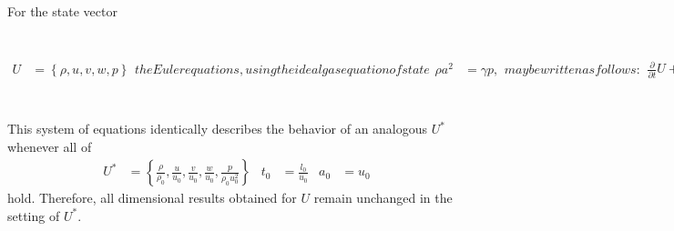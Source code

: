 \documentclass[letterpaper,11pt,nointlimits,reqno,draft]{amsbook}
\begin{document}
For the state vector
\begin{subequations}
\label{eq:eulerprim}
\begin{align}
  U &= \left\{ \rho, u, v, w, p \right\}
\end{align}
the Euler equations, using the ideal gas equation of state
\begin{align}
  \rho a^2 &= \gamma p,
\end{align}
may be written as follows:
\begin{align}
    \frac{\partial}{\partial{}t}U
+ A \frac{\partial}{\partial{}x}U
+ B \frac{\partial}{\partial{}y}U
+ C \frac{\partial}{\partial{}z}U
&= 0
\end{align}
\begin{align}
 A &= \begin{bmatrix}
        u & \rho     & 0 & 0 & 0              \\
        0 & u        & 0 & 0 & \frac{1}{\rho} \\
        0 & 0        & u & 0 & 0              \\
        0 & 0        & 0 & u & 0              \\
        0 & \gamma p & 0 & 0 & u              \\
       \end{bmatrix}
&
 B &= \begin{bmatrix}
        v & 0 & \rho     & 0 & 0              \\
        0 & v & 0        & 0 & 0              \\
        0 & 0 & v        & 0 & \frac{1}{\rho} \\
        0 & 0 & 0        & v & 0              \\
        0 & 0 & \gamma p & 0 & v              \\
       \end{bmatrix}
&
 C &= \begin{bmatrix}
        w & 0 & 0 & \rho     & 0              \\
        0 & w & 0 & 0        & 0              \\
        0 & 0 & w & 0        & 0              \\
        0 & 0 & 0 & w        & \frac{1}{\rho} \\
        0 & 0 & 0 & \gamma p & w              \\
       \end{bmatrix}
\end{align}
\end{subequations}
This system of equations identically describes the behavior of an analogous
$U^*$ whenever all of
\begin{align}
\label{eq:eulerprimnondim}
U^{*} &= \left\{
  \frac{\rho}{\rho_0},
  \frac{u}{u_0},
  \frac{v}{u_0},
  \frac{w}{u_0},
  \frac{p}{\rho_0 u_0^2}
\right\}
&
t_0 &= \frac{l_0}{u_0}
&
a_0 &= u_0
\end{align}
hold.  Therefore, all dimensional results obtained for $U$ remain unchanged
in the setting of $U^*$.
\end{document}
